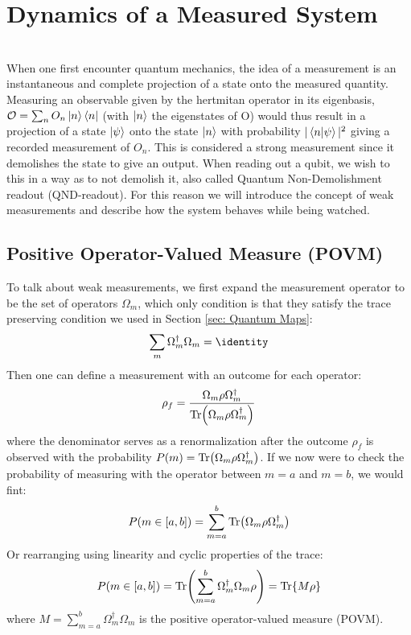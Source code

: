 \section{Dynamics of a Measured System}
 \\
\noindent
When one first encounter quantum mechanics, the idea of a measurement is an instantaneous and complete projection of a state onto the measured quantity. Measuring an observable given by the hertmitan operator in its eigenbasis, $\mathcal{O} = \sum_n O_n \ket{n}\bra{n}$ (with $\ket{n}$ the eigenstates of O) would thus result in a projection of a state $\ket{\psi}$ onto the state $\ket{n}$ with probability $|\braket{n}{\psi}|^2$ giving a recorded measurement of $O_n$.  This is considered a strong measurement since it demolishes the state to give an output. When reading out a qubit, we wish to this in a way as to not demolish it, also called Quantum Non-Demolishment readout (QND-readout). For this reason we will introduce the concept of weak measurements and describe how the system behaves while being watched.

\subsection{Positive Operator-Valued Measure (POVM)}
To talk about weak measurements, we first expand the measurement operator to be the set of operators $\Omega_m$, which only condition is that they satisfy the trace preserving condition we used in Section \ref{sec: Quantum Maps}: 
\begin{equation}
    \sum_m \Omega_m^\dagger \Omega_m = \identity 
\end{equation}
Then one can define a measurement with an outcome for each operator:
\begin{equation}
    \rho_f = \frac{\Omega_m\rho\Omega_m^\dagger}{\Tr(\Omega_m \rho \Omega_m^\dagger)}
\end{equation}
where the denominator serves as a renormalization after the outcome $\rho_f$ is observed with the probability $P(m) = \Tr(\Omega_m \rho \Omega_m^\dagger)$. If we now were to check the probability of measuring with the operator between $m = a$ and $m = b$, we would fint:
\begin{equation}
    P(m \in [a, b]) = \sum_{m = a}^b \Tr(\Omega_m\rho\Omega_m^\dagger)
\end{equation}
Or rearranging using linearity and cyclic properties of the trace:
\begin{equation}
    P(m \in [a, b]) = \Tr( \sum_{m = a}^b \Omega_m^\dagger \Omega_m\rho) = \Tr{M \rho}
\end{equation}
where $M = \sum_{m = a}^b \Omega_m^\dagger \Omega_m$ is the positive operator-valued measure (POVM).

